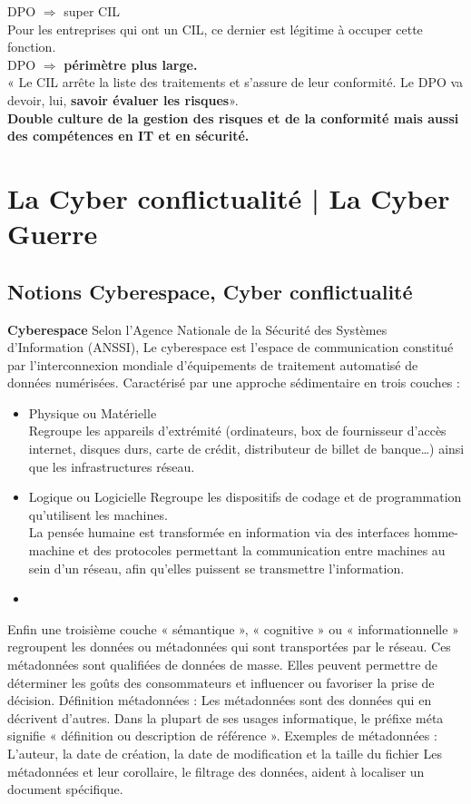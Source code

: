 \documentclass[a4paper,11pt]{report}
\begin{document}
DPO $\Rightarrow$ super CIL\\
Pour les entreprises qui ont un CIL, ce dernier est légitime à occuper cette fonction.\\
DPO $\Rightarrow$ \textbf{périmètre plus large.}\\
« Le CIL arrête la liste des traitements et s’assure de leur conformité. Le DPO va devoir, lui, \textbf{savoir évaluer les risques}».\\

\textbf{Double culture de la gestion des risques et de la conformité mais aussi des compétences en IT et en sécurité.}

\chapter{La Cyber conflictualité | La Cyber Guerre}
\section{Notions Cyberespace, Cyber conflictualité}
\textbf{Cyberespace}
Selon l’Agence Nationale de la Sécurité des Systèmes d’Information (ANSSI),
Le cyberespace est l’espace de communication constitué par l’interconnexion mondiale d’équipements de traitement automatisé de données numérisées.
Caractérisé par une approche sédimentaire en trois couches :
\begin{itemize}
    \item Physique ou Matérielle \\ 
    Regroupe les appareils d’extrémité (ordinateurs, box de fournisseur d’accès internet, disques durs, carte de crédit, distributeur de billet de banque…) ainsi que les infrastructures réseau.
    \item Logique ou Logicielle 
    Regroupe les dispositifs de codage et de programmation qu’utilisent les machines.\\
    La pensée humaine est transformée en information via des interfaces homme-machine et des protocoles permettant la communication entre machines au sein d’un réseau, afin qu’elles puissent se transmettre l’information.\\
    \item 
\end{itemize}


Enfin une troisième couche « sémantique », « cognitive » ou « informationnelle » regroupent les données ou métadonnées qui sont transportées par le réseau.
Ces métadonnées sont qualifiées de données de masse. Elles peuvent permettre de déterminer les goûts des consommateurs et influencer ou favoriser la prise de décision.
Définition métadonnées : 
Les métadonnées sont des données qui en décrivent d’autres.
Dans la plupart de ses usages informatique, le préfixe méta signifie « définition ou description de référence ».
Exemples de métadonnées : L’auteur, la date de création, la date de modification et la taille du fichier
Les métadonnées et leur corollaire, le filtrage des données, aident à localiser un document spécifique.
\end{document}
